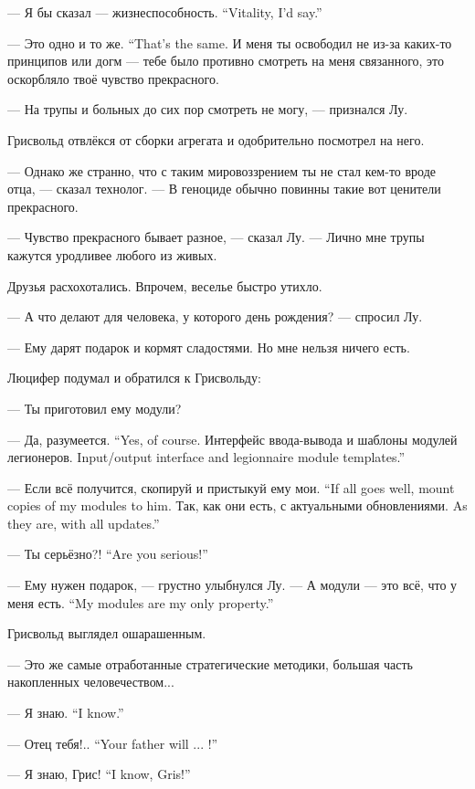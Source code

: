 {--- Я бы сказал --- жизнеспособность.}
{``Vitality, I'd say.''}

{--- Это одно и то же.}
{``That's the same.}
И меня ты освободил не из-за каких-то принципов или догм --- тебе было противно смотреть на меня связанного, это оскорбляло твоё чувство прекрасного.

--- На трупы и больных до сих пор смотреть не могу, --- признался Лу.

Грисвольд отвлёкся от сборки агрегата и одобрительно посмотрел на него.

--- Однако же странно, что с таким мировоззрением ты не стал кем-то вроде отца, --- сказал технолог.
--- В геноциде обычно повинны такие вот ценители прекрасного.

--- Чувство прекрасного бывает разное, --- сказал Лу.
--- Лично мне трупы кажутся уродливее любого из живых.

Друзья расхохотались.
Впрочем, веселье быстро утихло.

--- А что делают для человека, у которого день рождения? --- спросил Лу.

--- Ему дарят подарок и кормят сладостями.
Но мне нельзя ничего есть.

Люцифер подумал и обратился к Грисвольду:

--- Ты приготовил ему модули?

{--- Да, разумеется.}
{``Yes, of course.}
{Интерфейс ввода-вывода и шаблоны модулей легионеров.}
{Input/output interface and legionnaire module templates.''}

{--- Если всё получится, скопируй и пристыкуй ему мои.}
{``If all goes well, mount copies of my modules to him.}
{Так, как они есть, с актуальными обновлениями.}
{As they are, with all updates.''}

{--- Ты серьёзно?!}
{``Are you serious!''}

--- Ему нужен подарок, --- грустно улыбнулся Лу.
{--- А модули --- это всё, что у меня есть.}
{``My modules are my only property.''}

Грисвольд выглядел ошарашенным.

--- Это же самые отработанные стратегические методики, большая часть накопленных человечеством...

{--- Я знаю.}
{``I know.''}

{--- Отец тебя!..}
{``Your father will ... !''}

{--- Я знаю, Грис!}
{``I know, Gris!''}


